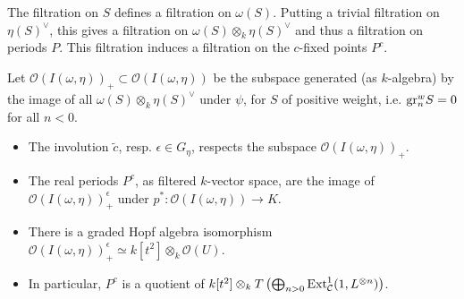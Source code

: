 \begin{defn}
 The filtration on $S$ defines a filtration on $\omega(S)$. Putting a trivial filtration on $\eta(S)^\vee$, this gives a filtration on $\omega(S) \otimes_k \eta(S)^\vee$ and thus a filtration on periods $P$. This filtration induces a filtration on the $c$-fixed points $P^c$.
\end{defn}

\begin{defn}
 Let $\mathcal{O}(I(\omega,\eta))_+ \subset \mathcal{O}(I(\omega,\eta))$ be the subspace generated (as $k$-algebra) by the image of all $\omega(S) \otimes_k \eta(S)^\vee$ under $\psi$, for $S$ of positive weight, i.e. $\mathrm{gr}_n^w S = 0$ for all $n < 0$.
\end{defn}


\begin{thm}\label{thm:realperiods}{\quad}
\begin{itemize}
 \item The involution $\tilde{c}$, resp. $\epsilon \in G_\eta$, respects the subspace $\mathcal{O}(I(\omega,\eta))_+$.
 \item The real periods $P^c$, as filtered $k$-vector space, are the image of $\mathcal{O}(I(\omega,\eta))^{\epsilon}_+$ under $p^\ast : \mathcal{O}(I(\omega,\eta)) \to K$.
 \item There is a graded Hopf algebra isomorphism $\mathcal{O}(I(\omega,\eta))_+^{\epsilon} \simeq k[t^2] \otimes_k \mathcal{O}(U)$.
 \item In particular, $P^c$ is a quotient of $k[t^2] \otimes_k T\left(\bigoplus_{n>0} \mathrm{Ext}^1_{\mathcal{C}}(1,L^{\otimes n})\right)$.
\end{itemize}
\end{thm}
